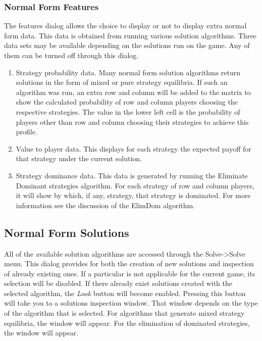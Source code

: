 \subsubsection{Normal Form Features}\label{nffeaturessec}
The features dialog allows the choice to display or not to display extra
normal form data.  This data is obtained from running various solution
algorithms.  Three data sets may be available depending on the solutions
run on the game.  Any of them can be turned off through this dialog.
\begin{enumerate}
\item Strategy probability data.  Many normal form solution
algorithms return solutions in the form of mixed or pure strategy
equilibria.  If such an algorithm was run, an extra row and column will be
added to the matrix to show the calculated probability of row and column
players choosing the respective strategies.  The value in the lower left
cell is the probability of players other than row and column choosing
their strategies to achieve this profile.
\item Value to player data.  This displays for each strategy the expected 
payoff for that strategy under the current solution.  
\item Strategy dominance data.  This data is generated by running
the Eliminate Dominant strategies algorithm.  For each strategy of row and
column players, it will show by which, if any, strategy, that strategy is
dominated.  For more information see the discussion of the ElimDom
algorithm.
\end{enumerate}

\subsection{Normal Form Solutions}\label{NormalFormSolutions}
All of the available solution algorithms are accessed through the
Solve->Solve menu.  This dialog provides for both the creation of new
solutions and inspection of already existing ones.  If a particular 
 is not applicable for the current game, 
its selection will be 
disabled.  If there already exist solutions created with the selected
algorithm, the {\em Look} button will become enabled.  Pressing this
button will take you to a solutions inspection window.  That window
depends on the type of the algorithm that is selected.  For algorithms
that generate mixed strategy equilibria, the   window will appear.  For the elimination
of dominated strategies, the 
 window will appear.  

